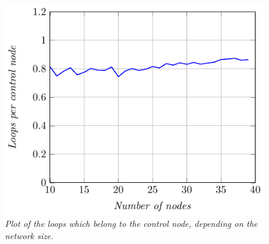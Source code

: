 \begin{figure}[h]
\centering
\includegraphics[scale=1.5]{images/controlnodes.pdf}
\caption{\emph{Plot of the loops which belong to the control node, depending on the network size.}}
\label{fig:controlnodes}
\end{figure}



